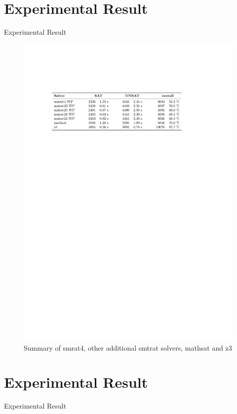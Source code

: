 \documentclass[]{beamer}
\begin{document}
\section{Experimental Result}
\begin{frame}{Experimental Result}
\begin{figure}[!ht]
    \centering
    \caption{Summary of smrat4, other additional smtrat solvers, mathsat and z3}
    \includegraphics[width=1\linewidth]{../figures/summarySolvers.pdf}
\end{figure}
\end{frame}

\section{Experimental Result}
\begin{frame}{Experimental Result}
\end{frame}
\end{document}

